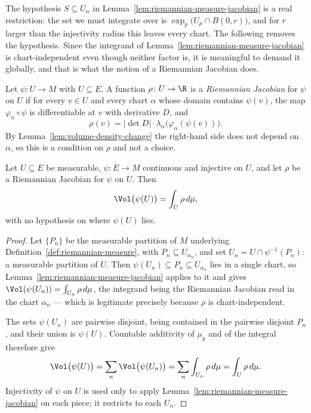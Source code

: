 The hypothesis $S\subseteq U_\alpha$ in
Lemma~\ref{lem:riemannian-measure-jacobian} is a real restriction: the
set we must integrate over is $\exp_p\bigl(U_p\cap B(0,r)\bigr)$, and
for $r$ larger than the injectivity radius this leaves every chart. The
following removes the hypothesis. Since the integrand of
Lemma~\ref{lem:riemannian-measure-jacobian} is chart-independent even
though neither factor is, it is meaningful to demand it globally, and
that is what the notion of a Riemannian Jacobian does.

\begin{definition}
\label{def:riemannian-jacobian}
\leanok
Let $\psi\colon U\to M$ with $U\subseteq E$. A function $\rho\colon
U\to\R$ is a \emph{Riemannian Jacobian} for $\psi$ on $U$ if for every
$v\in U$ and every chart $\alpha$ whose domain contains $\psi(v)$, the
map $\varphi_\alpha\circ\psi$ is differentiable at $v$ with derivative
$D$, and
$$\rho(v)=\lvert\det D\rvert\cdot
\lambda_\alpha\bigl(\varphi_\alpha(\psi(v))\bigr).$$
By Lemma~\ref{lem:volume-density-change} the right-hand side does not
depend on $\alpha$, so this is a condition on $\rho$ and not a choice.
\end{definition}

\begin{lemma}
\label{lem:riemannian-measure-jacobian-global}
\leanok
Let $U\subseteq E$ be measurable, $\psi\colon E\to M$ continuous and
injective on $U$, and let $\rho$ be a Riemannian Jacobian for $\psi$ on
$U$. Then
$$\Vol\bigl(\psi(U)\bigr)=\int_U \rho\,d\mu,$$
with no hypothesis on where $\psi(U)$ lies.
\end{lemma}

\begin{proof}
\leanok
Let $\{P_n\}$ be the measurable partition of $M$ underlying
Definition~\ref{def:riemannian-measure}, with $P_n\subseteq
U_{\alpha_n}$, and set $U_n=U\cap\psi^{-1}(P_n)$: a measurable
partition of $U$. Then $\psi(U_n)\subseteq P_n\subseteq U_{\alpha_n}$
lies in a single chart, so
Lemma~\ref{lem:riemannian-measure-jacobian} applies to it and gives
$\Vol(\psi(U_n))=\int_{U_n}\rho\,d\mu$, the integrand being the
Riemannian Jacobian read in the chart $\alpha_n$ --- which is
legitimate precisely because $\rho$ is chart-independent.

The sets $\psi(U_n)$ are pairwise disjoint, being contained in the
pairwise disjoint $P_n$, and their union is $\psi(U)$. Countable
additivity of $\mu_g$ and of the integral therefore give
$$\Vol\bigl(\psi(U)\bigr)=\sum_n\Vol\bigl(\psi(U_n)\bigr)
=\sum_n\int_{U_n}\rho\,d\mu=\int_U\rho\,d\mu.$$
Injectivity of $\psi$ on $U$ is used only to apply
Lemma~\ref{lem:riemannian-measure-jacobian} on each piece; it restricts
to each $U_n$.
\end{proof}


